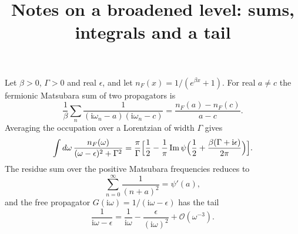 \documentclass{article}
\title{Notes on a broadened level: sums, integrals and a tail}
\newcommand{\ii}{\mathrm{i}}
\begin{document}
\maketitle
Let $\beta>0$, $\Gamma>0$ and real $\epsilon$, and let $n_F(x)=1/(e^{\beta x}+1)$.
For real $a\neq c$ the fermionic Matsubara sum of two propagators is
\begin{equation}
\label{eq:bubble}
\frac{1}{\beta}\sum_n \frac{1}{(\ii\omega_n-a)(\ii\omega_n-c)} = \frac{n_F(a)-n_F(c)}{a-c}.
\end{equation}
Averaging the occupation over a Lorentzian of width $\Gamma$ gives
\begin{equation}
\label{eq:lorentz}
\int d\omega\,\frac{n_F(\omega)}{(\omega-\epsilon)^2+\Gamma^2}
 = \frac{\pi}{\Gamma}\Bigl[\frac12-\frac{1}{\pi}\,\mathrm{Im}\,\psi\Bigl(\frac12+\frac{\beta(\Gamma+\ii\epsilon)}{2\pi}\Bigr)\Bigr].
\end{equation}
The residue sum over the positive Matsubara frequencies reduces to
\begin{equation}
\label{eq:trigamma}
\sum_{n=0}^{\infty}\frac{1}{(n+a)^2} = \psi'(a) ,
\end{equation}
and the free propagator $G(\ii\omega)=1/(\ii\omega-\epsilon)$ has the tail
\begin{equation}
\label{eq:tail}
\frac{1}{\ii\omega-\epsilon} = \frac{1}{\ii\omega} - \frac{\epsilon}{(\ii\omega)^2} + \mathcal{O}(\omega^{-3}) .
\end{equation}
\end{document}

